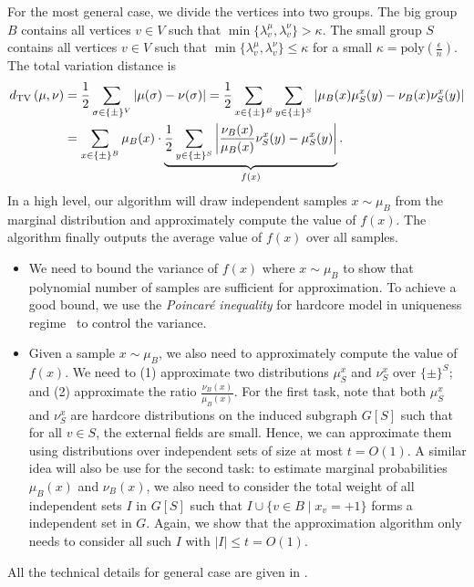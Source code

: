 For the most general case, we divide the vertices into two groups. The big group $B$ contains all vertices $v \in V$ such that $\min\{\lambda^\mu_v,\lambda^\nu_v\} > \kappa$. The small group $S$ contains all vertices $v \in V$ such that $\min\{\lambda^\mu_v,\lambda^\nu_v\} \leq \kappa$ for a small $\kappa = \mathrm{poly}(\frac{\epsilon}{n})$. The total variation distance is
\begin{align*}
    d_{\mathrm{TV}}\left({\mu},{\nu}\right) &= \frac{1}{2}\sum_{\sigma \in \{\pm\}^V} \left|\mu(\sigma)-{\nu(\sigma)}\right| = \frac{1}{2}\sum_{x \in \{\pm\}^B}\sum_{y \in \{\pm\}^S} \left|\mu_B(x)\mu_S^x(y)-\nu_B(x)\nu_S^x(y)\right|\\
    &= \sum_{x \in \{\pm\}^B}\mu_B(x) \cdot  \underbrace{\frac{1}{2}\sum_{y \in \{\pm\}^S} \left|\frac{\nu_B(x)}{\mu_B(x)}\nu_S^x(y)-\mu_S^x(y)\right|}_{f(x)}.
\end{align*}
In a high level, our algorithm will draw independent samples $x \sim \mu_B$ from the marginal distribution and approximately compute the value of $f(x)$. The algorithm finally outputs the average value of $f(x)$ over all samples. 
\begin{itemize}
    \item We need to bound the variance of $f(x)$ where $x \sim \mu_B$ to show that polynomial number of samples are sufficient for approximation. To achieve a good bound, we use the \emph{Poincar\'e inequality} for hardcore model in uniqueness regime~\cite{ChenFYZ21} to control the variance.
    \item Given a sample $x \sim \mu_B$, we also need to approximately compute the value of $f(x)$. We need to (1) approximate two distributions $\mu_S^x$ and $\nu_S^x$ over $\{\pm\}^S$; and (2) approximate the ratio $\frac{\nu_B(x)}{\mu_B(x)}$. For the first task, note that both $\mu_S^x$ and $\nu_S^x$ are hardcore distributions on the induced subgraph $G[S]$ such that for all $v \in S$, the external fields are small. Hence, we can approximate them using distributions over independent sets of size at most $t = O(1)$. A similar idea will also be use for the second task: to estimate marginal probabilities $\mu_B(x)$ and $\nu_B(x)$, we also need to consider the total weight of all independent sets $I$ in $G[S]$ such that $I \cup \{v \in B \mid x_v = +1\}$ forms a independent set in $G$. Again, we show that the approximation algorithm only needs to consider all such $I$ with $|I| \leq t = O(1)$.
\end{itemize}
All the technical details for general case are given in .




